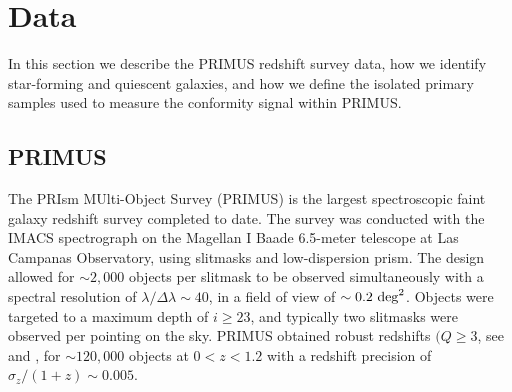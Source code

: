 
\section{Data}\label{sec:data}

In this section we describe the PRIMUS redshift survey data, how we identify star-forming
and quiescent galaxies, and how we define the isolated primary samples used to measure 
the conformity signal within PRIMUS.


\subsection{PRIMUS}\label{sec:PRIMUS}
 
The PRIsm MUlti-Object Survey (PRIMUS) is the largest spectroscopic faint galaxy redshift survey completed to date.
The survey was conducted with the IMACS spectrograph \citep{Bigelow03} on the Magellan I Baade 6.5-meter telescope at 
Las Campanas 
Observatory, using slitmasks and low-dispersion prism.
The design allowed for $\sim2,000$ objects per slitmask to be observed simultaneously with a spectral resolution of ${\lambda/\Delta
\lambda \sim 40}$, in 
a field of view of $\sim0.2~\degsq$.
Objects were targeted to a maximum depth of ${i \ge 23}$, and typically two slitmasks were observed per pointing on the sky.  
PRIMUS obtained robust redshifts $({Q \ge 3}$, see \citet{Coil11} and \citet{Cool13}, for $\sim120,000$ objects at ${0<z<1.2}$ with a 
redshift precision of ${\sigma_{z}/(1 + z) \sim 0.005}$.

